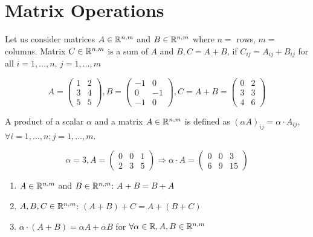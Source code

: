 \section{Matrix Operations}
\begin{definition}
Let us consider matrices $A\in\mathbb{R}^{n,m}$ and $B\in\mathbb{R}^{n,m}$ where $n=$ rows, $m=$ columns. Matrix $C\in\mathbb{R}^{n,m}$ is a sum of $A$ and $B, C=A+B$, if $C_{ij} = A_{ij}+B_{ij}$ for all $i=1,\dots,n$, $j=1,\dots,m$
\end{definition}
\begin{example}
\[
A = \begin{pmatrix}
1 & 2\\
3 & 4\\
5 & 5
\end{pmatrix}, B = \begin{pmatrix}
-1 & 0\\
0 & -1\\
-1 & 0
\end{pmatrix}, C = A+B = \begin{pmatrix}
0 & 2\\
3 & 3\\
4 & 6
\end{pmatrix}
\]	
\end{example}
\begin{definition}
A product of a scalar $\alpha$ and a matrix $A\in\mathbb{R}^{n,m}$ is defined as $\left( \alpha A\right)_{ij} = \alpha\cdot A_{ij}$, $\forall i=1,\dots,n; j=1,\dots,m$.
\end{definition}
\begin{example}
\[\alpha = 3,A = \begin{pmatrix}
0 & 0 & 1\\
2 & 3 & 5	
\end{pmatrix}\Rightarrow \alpha\cdot A = \begin{pmatrix}
0 & 0 & 3\\
6 & 9 & 15
\end{pmatrix}
\]	
\end{example}
\begin{properties}
\begin{enumerate}
\item $A\in\mathbb{R}^{n,m}$ and $B\in\mathbb{R}^{n,m}$: $A+B = B+A$\\
\item $A,B,C\in\mathbb{R}^{n,m}$: $(A+B)+C = A+(B+C)$
\item $\alpha\cdot (A+B) = \alpha A+\alpha B$ for $\forall \alpha\in\mathbb{R}, A,B\in\mathbb{R}^{n,m}$
\end{enumerate}
	
\end{properties}


